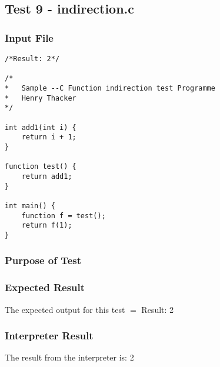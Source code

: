 \subsection{Test 9 - indirection.c}
\subsubsection{Input File}
\begin{lstlisting}[showstringspaces=false,breaklines=true,backgroundcolor=\color{light-gray}, captionpos=b]
/*Result: 2*/

/*
*	Sample --C Function indirection test Programme
*	Henry Thacker
*/

int add1(int i) {
	return i + 1;
}

function test() {
	return add1;
}

int main() {
	function f = test();
	return f(1);
}
\end{lstlisting}\subsubsection{Purpose of Test}

\subsubsection{Expected Result}
The expected output for this test $=$ Result: 2
\subsubsection{Interpreter Result}
The result from the interpreter is: 2
